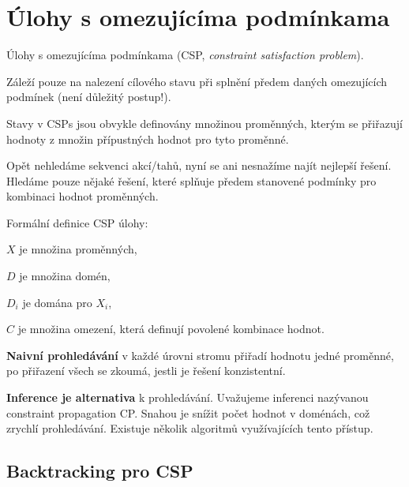 
\section{Úlohy s omezujícíma podmínkama}

\begin{compactitem}
    \item Úlohy s omezujícíma podmínkama (CSP, \textit{constraint satisfaction problem}).

    \item Záleží pouze na nalezení cílového stavu při splnění předem daných omezujících podmínek (není důležitý postup!).

    \item Stavy v CSPs jsou obvykle definovány množinou proměnných, kterým se přiřazují hodnoty z množin přípustných hodnot pro tyto proměnné.

    \item Opět nehledáme sekvenci akcí/tahů, nyní se ani nesnažíme najít nejlepší řešení. Hledáme pouze nějaké řešení, které splňuje předem stanovené podmínky pro kombinaci hodnot proměnných.

    \item Formální definice CSP úlohy: \begin{compactitem}
        \item $X$ je množina proměnných,
        \item $D$ je množina domén,
        \item $D_i$ je domána pro $X_i$,
        \item $C$ je množina omezení, která definují povolené kombinace hodnot.
    \end{compactitem}

    \item \textbf{Naivní prohledávání} v každé úrovni stromu přiřadí hodnotu jedné proměnné, po přiřazení všech se zkoumá, jestli je řešení konzistentní.

    \item \textbf{Inference je alternativa} k prohledávání. Uvažujeme inferenci nazývanou constraint propagation CP. Snahou je snížit počet hodnot v
    doménách, což zrychlí prohledávání. Existuje několik algoritmů využívajících tento přístup.
\end{compactitem}

\subsection{Backtracking pro CSP}

